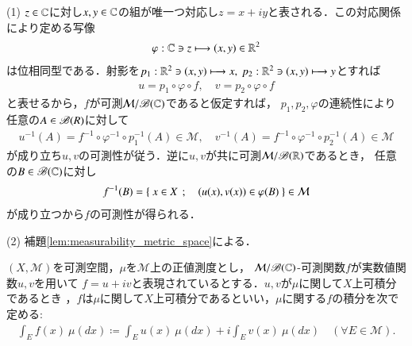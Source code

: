 	\begin{prf}\mbox{}
		\item[(1)] $z \in \mathbb{C}$に対し$x,y \in \mathbb{C}$の組が唯一つ対応し$z = x + i y$と表される．この対応関係により定める写像
			\begin{align}
				\varphi:\mathbb{C} \ni z \longmapsto (x,y) \in \mathbb{R}^2
			\end{align}
			は位相同型である．射影を$p_1:\mathbb{R}^2 \ni (x,y) \longmapsto x,
			\ p_2:\mathbb{R}^2 \ni (x,y) \longmapsto y$とすれば
			\begin{align}
				u = p_1 \circ \varphi \circ f,
				\quad v = p_2 \circ \varphi \circ f
			\end{align}
			と表せるから，$f$が可測$\mathcal{M}/\mathscr{B}(\mathbb{C})$であると仮定すれば，
			$p_1,p_2,\varphi$の連続性により任意の$A \in \mathscr{B}(R)$に対して
			\begin{align}
				u^{-1}(A) = f^{-1} \circ \varphi^{-1} \circ p_1^{-1}(A) \in \mathcal{M},
				\quad v^{-1}(A) = f^{-1} \circ \varphi^{-1} \circ p_2^{-1}(A) \in \mathcal{M}
			\end{align}
			が成り立ち$u,v$の可測性が従う．逆に$u,v$が共に可測$\mathcal{M}/\mathscr{B}(\mathbb{R})$であるとき，
			任意の$B \in \mathscr{B}(\mathbb{C})$に対し
			\begin{align}
				f^{-1}(B) = \left\{\ x \in X\ \, ; \quad (u(x),v(x)) \in \varphi(B)\ \right\} \in \mathcal{M}
			\end{align}
			が成り立つから$f$の可測性が得られる．
		
		\item[(2)] 補題\ref{lem:measurability_metric_space}による．
			\QED
	\end{prf}
	
	\begin{screen}
		\begin{dfn}[複素数値可測関数の正値測度に関する積分]
			$(X,\mathcal{M})$を可測空間，$\mu$を$\mathcal{M}$上の正値測度とし，
			$\mathcal{M}/\mathscr{B}(\mathbb{C})$-可測関数$f$が実数値関数$u,v$を用いて
			$f = u + i v$と表現されているとする．$u,v$が$\mu$に関して$X$上可積分であるとき\footnotemark
			，$f$は$\mu$に関して$X$上可積分であるといい，$\mu$に関する$f$の積分を次で定める:
			\begin{align}
				\int_E f(x)\ \mu(dx)
				\coloneqq \int_E u(x)\ \mu(dx) + i \int_E v(x)\ \mu(dx)
				\quad (\forall E \in \mathcal{M}).
			\end{align}
		\end{dfn}
	\end{screen}

	
